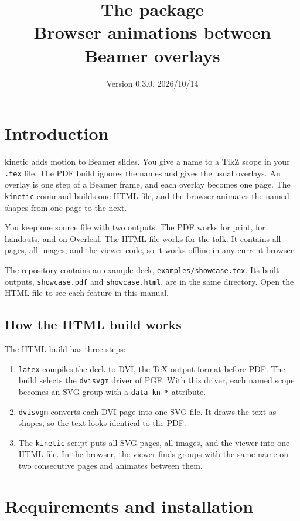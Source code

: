 \documentclass[11pt]{article}
\title{The \pkg{} package\\[0.3em]\large Browser animations between Beamer overlays}
\date{Version 0.3.0, 2026/10/14}
\newcommand{\pkg}{\textsf{kinetic}}
\newcommand{\cmd}[1]{\texttt{#1}}
\begin{document}
\maketitle
\tableofcontents

\section{Introduction}

\pkg{} adds motion to Beamer slides. You give a name to a TikZ scope in your
\cmd{.tex} file. The PDF build ignores the names and gives the usual overlays.
An overlay is one step of a Beamer frame, and each overlay becomes one page. The
\cmd{kinetic} command builds one HTML file, and the browser animates the named
shapes from one page to the next.

You keep one source file with two outputs. The PDF works for print, for handouts,
and on Overleaf. The HTML file works for the talk. It contains all pages, all
images, and the viewer code, so it works offline in any current browser.

The repository contains an example deck, \cmd{examples/showcase.tex}. Its built
outputs, \cmd{showcase.pdf} and \cmd{showcase.html}, are in the same directory.
Open the HTML file to see each feature in this manual.

\subsection{How the HTML build works}

The HTML build has three steps:
\begin{enumerate}
	\item \cmd{latex} compiles the deck to DVI, the TeX output format before PDF.
	      The build selects the \cmd{dvisvgm} driver of PGF. With this driver, each
	      named scope becomes an SVG group with a \cmd{data-kn-*} attribute.
	\item \cmd{dvisvgm} converts each DVI page into one SVG file. It draws the text
	      as shapes, so the text looks identical to the PDF.
	\item The \cmd{kinetic} script puts all SVG pages, all images, and the viewer
	      into one HTML file. In the browser, the viewer finds groups with the same name
	      on two consecutive pages and animates between them.
\end{enumerate}

\section{Requirements and installation}
\end{document}
